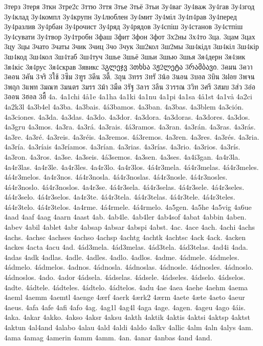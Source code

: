 3терз
3теря
3ткн
3тре2с
3ттю
3ття
3тье
3тьё
3тьи
3у4ваг
3у4важ
3у4гав
3у4згод
3у4клад
3у4компл
3у4крупн
3у4люблен
3у4мит
3у4міл
3у4п4рав
3у4перед
3у4разлив
3у4рбан
3у4рочист
3у4ряд
3у4рядов
3у4спіш
3у4станов
3у4стпіш
3у4сувати
3у4твор
3у4тробн
3фаш
3фит
3фон
3фот
3х2ны
3х4то
3ца.
3цам
3цах
3цу
3цы
3чато
3чаты
3чик
3чиц
3чо
3чук
3ш2кол
3ш2мы
3ш4кідл
3ш4кіл
3ш4кір
3ш4код
3ш4кол
3ш4таб
3ш4туч
3шье
3шьё
3шьи
3шью
3шья
3я4дерн
3я4зик
3я4кіс
3я4рус
3я4скрав
3явикс
3გლეჯვ
3თხსა
3ჟ2ლეტა
3რამბავი.
3คมน
3ควา
3คอน
3คัน
3จริ
3ใช้
3ซึม
3ฑูร
3ดีน
3ตี้.
3ถุน
3ทรร
3ทรั
3น้อ
3นอน
3บอล
3บิน
3ฝอย
3พจน
3พฤก
3แพท
3มณฑ
3มนตร
3มรร
3ม้า
3มืด
3รัฐ
3ลาร
3ลีน
3วรรณ
3วิท
3ศรี
3สมบ
3ส่ว
3อ่อ
3ออน
3ฮอล
3ฮื้
4a.
4a1chi
4å1e
4a1ha
4a1ki
4a1nu
4a1pi
4a1sa
4å1st
4a1vå
4a2ci
4a2k3l
4a3b4el
4a3ba.
4a3bais.
4á3bamos.
4a3ban.
4a3bas.
4a3blem
4a3ción.
4a3ciones.
4a3da.
4a3das.
4a3do.
4a3dor.
4a3dora.
4a3doras.
4a3dores.
4a3dos.
4a3gru
4a3mos.
4a3ra.
4a3rá.
4a3rais.
4á3ramos.
4a3ran.
4a3rán.
4a3ras.
4a3rás.
4a3re.
4a3ré.
4a3reis.
4a3réis.
4a3remos.
4á3remos.
4a3ren.
4a3res.
4a3rés.
4a3ria.
4a3ría.
4a3ríais
4a3ríamos.
4a3rían.
4a3rias.
4a3rías.
4a3rio.
4a3rios.
4a3rís.
4a3ron.
4a3ros.
4a3se.
4a3seis.
4á3semos.
4a3sen.
4a3ses.
4a4i3gan.
4a4r3la.
4a4r3las.
4a4r3le.
4a4r3les.
4a4r3lo.
4a4r3los.
4á4r3mela.
4á4r3melas.
4á4r3meles.
4á4r3melos.
4a4r3nos.
4á4r3nosla.
4á4r3noslas.
4á4r3nosle.
4á4r3nosles.
4á4r3noslo.
4á4r3noslos.
4a4r3se.
4á4r3sela.
4á4r3selas.
4á4r3sele.
4á4r3seles.
4á4r3selo.
4á4r3selos.
4a4r3te.
4á4r3tela.
4á4r3telas.
4á4r3tele.
4á4r3teles.
4á4r3telo.
4á4r3telos.
4a4rme.
4á4rmele.
4á4rmelo.
4a5gen.
4a5he
4a5vig
4a6ue
4aad
4aaf
4aag
4aarn
4aast
4ab.
4ab4le.
4ab4ler
4ab4sof
4abat
4abbin
4aben.
4abev
4abil
4ablet
4abr
4absap
4absar
4abspi
4abst.
4ac.
4ace
4ach.
4achi
4achs
4achs.
4achsc
4achses
4achso
4achsp
4achtg
4achtk
4achtsc
4ack
4ack.
4acken
4ackes
4acta
4acu
4ad.
4ád3mela.
4ád3melas.
4ád3tela.
4ád3telas.
4ad4i
4ada.
4adas
4adk
4adlas.
4adle.
4adles.
4adlo.
4adlos.
4adme.
4ádmele.
4ádmeles.
4ádmelo.
4ádmelos.
4adnos.
4ádnosla.
4ádnoslas.
4ádnosle.
4ádnosles.
4ádnoslo.
4ádnoslos.
4ado.
4ador
4ádsela.
4ádselas.
4ádsele.
4ádseles.
4ádselo.
4ádselos.
4adte.
4ádtele.
4ádteles.
4ádtelo.
4ádtelos.
4adu
4ae
4aea
4aehe
4aehm
4aema
4aeml
4aemm
4aemtl
4aenge
4ærf
4aerk
4ærk2
4ærm
4aete
4æte
4aeto
4aeur
4aeus.
4afa
4afe
4afi
4afo
4ag.
4ag1l
4ag4l
4aga
4age.
4agen.
4ageu
4ago
4áis.
4aka.
4akar
4akko.
4akso
4aksr
4aksu
4akth
4aktik
4aktis
4aktsi
4aktsp
4aktst
4aktun
4al4and
4alabo
4alau
4ald
4aldi
4aldo
4alkv
4allic
4alm
4aln
4alys
4am.
4ama
4amag
4amerin
4amm
4amm.
4an.
4anar
4anbas
4and
4and.
